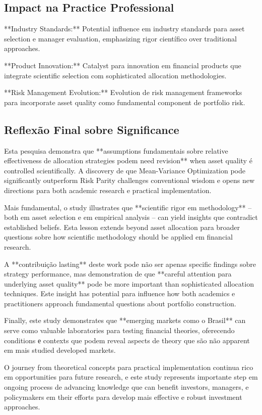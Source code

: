 \subsection{Impact na Practice Professional}

**Industry Standards:** Potential influence em industry standards para asset selection e manager evaluation, emphasizing rigor científico over traditional approaches.

**Product Innovation:** Catalyst para innovation em financial products que integrate scientific selection com sophisticated allocation methodologies.

**Risk Management Evolution:** Evolution de risk management frameworks para incorporate asset quality como fundamental component de portfolio risk.

\subsection{Reflexão Final sobre Significance}

Esta pesquisa demonstra que **assumptions fundamentais sobre relative effectiveness de allocation strategies podem need revision** when asset quality é controlled scientifically. A discovery de que Mean-Variance Optimization pode significantly outperform Risk Parity challenges conventional wisdom e opens new directions para both academic research e practical implementation.

Mais fundamental, o study illustrates que **scientific rigor em methodology** – both em asset selection e em empirical analysis – can yield insights que contradict established beliefs. Esta lesson extends beyond asset allocation para broader questions sobre how scientific methodology should be applied em financial research.

A **contribuição lasting** deste work pode não ser apenas specific findings sobre strategy performance, mas demonstration de que **careful attention para underlying asset quality** pode be more important than sophisticated allocation techniques. Este insight has potential para influence how both academics e practitioners approach fundamental questions about portfolio construction.

Finally, este study demonstrates que **emerging markets como o Brasil** can serve como valuable laboratories para testing financial theories, oferecendo conditions е contexts que podem reveal aspects de theory que são não apparent em mais studied developed markets.

O journey from theoretical concepts para practical implementation continua rico em opportunities para future research, e este study represents importante step em ongoing process de advancing knowledge que can benefit investors, managers, e policymakers em their efforts para develop mais effective e robust investment approaches.